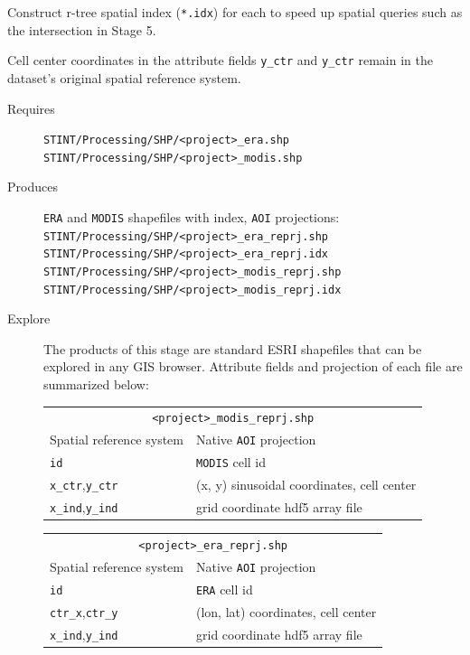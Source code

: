 \documentclass[twoside,a4paper]{refart}
\begin{document}
Construct r-tree spatial index (\texttt{*.idx}) for each to speed up spatial queries such as the intersection in Stage 5.

Cell center coordinates in the attribute fields \texttt{y\_ctr} and \texttt{y\_ctr} remain in the dataset's original spatial reference system.

  \begin{description}
    \item [Requires]
      \texttt{STINT/Processing/SHP/<project>\_era.shp}\\
      \texttt{STINT/Processing/SHP/<project>\_modis.shp}
  
    \item [Produces]
      \texttt{ERA} and \texttt{MODIS} shapefiles with index, 
      \texttt{AOI} projections:\\ 
      \texttt{STINT/Processing/SHP/<project>\_era\_reprj.shp}\\
      \texttt{STINT/Processing/SHP/<project>\_era\_reprj.idx}\\
      \texttt{STINT/Processing/SHP/<project>\_modis\_reprj.shp}\\
      \texttt{STINT/Processing/SHP/<project>\_modis\_reprj.idx}      
      

    \item [Explore]
      The products of this stage are standard ESRI shapefiles that can be explored in any GIS browser.  Attribute fields and projection of each file are summarized below:
      
\begin{tabular}{ll}
       \multicolumn{2}{c}{\texttt{<project>\_modis\_reprj.shp}} \\
Spatial reference system        & Native \texttt{AOI} projection \\
\texttt{id}                     & \texttt{MODIS} cell id \\  
\texttt{x\_ctr},\texttt{y\_ctr} & (x, y) sinusoidal coordinates, cell center \\
\texttt{x\_ind},\texttt{y\_ind} & grid coordinate hdf5 array file\\
\end{tabular}
      
\begin{tabular}{ll}
       \multicolumn{2}{c}{ \texttt{<project>\_era\_reprj.shp}} \\
Spatial reference system        & Native \texttt{AOI} projection \\
\texttt{id}                     & \texttt{ERA} cell id\\
\texttt{ctr\_x},\texttt{ctr\_y} & (lon, lat) coordinates, cell center \\ 
\texttt{x\_ind},\texttt{y\_ind} & grid coordinate hdf5 array file\\
\end{tabular}

  \end{description}
\end{document}
